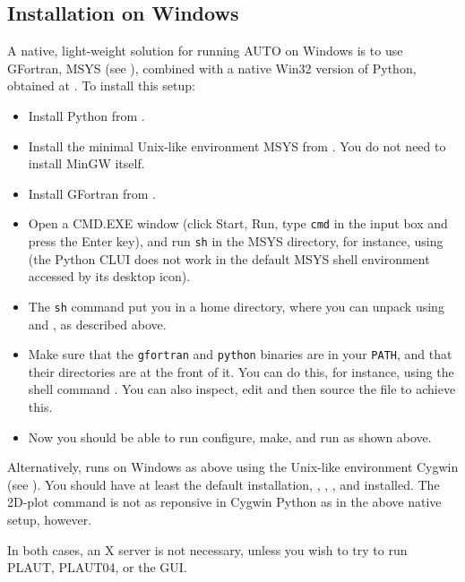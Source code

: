 \documentclass[12pt]{report}
\begin{document}
\subsection{Installation on Windows}
A native, light-weight solution for running AUTO on Windows is
to use GFortran, MSYS (see ),
combined with a native Win32 version of Python,
obtained at . To install this setup:
\begin{itemize}
\item
Install Python from .
\item
Install the minimal Unix-like environment MSYS from
. You do not need to install MinGW
itself.
\item
Install GFortran from .
\item
Open a CMD.EXE window (click Start, Run, type {\tt cmd}
in the input box and press the Enter key), and run {\tt sh} in the
MSYS directory, for instance, using
(the Python CLUI does not work in the default MSYS shell environment
 accessed by its desktop icon).
\item
The {\tt sh} command put you in a home directory, where you can unpack
\AUTO using  and , as described above.
\item
Make sure that the {\tt gfortran} and {\tt python} binaries
are in your {\tt PATH}, and that their directories are at the front of it.
You can do this, for instance, using the shell command
.
You can also inspect, edit and then source the file
 to achieve this.
\item
Now you should be able to run configure, make, and run \AUTO as
shown above.
\end{itemize}

Alternatively, \AUTO runs on Windows as above using the Unix-like
environment Cygwin (see ). You should have
at least the default installation, , ,
, and  installed. The 2D-plot command
is not as reponsive in Cygwin Python as in the above native setup, however.

In both cases, an X server is not necessary, unless you wish to try to run
PLAUT, PLAUT04, or the GUI.
\end{document}
